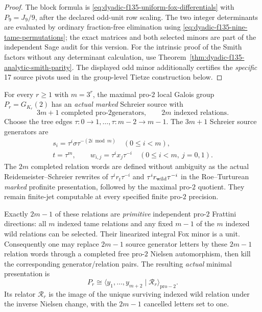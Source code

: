 \begin{proof}
The block formula
is
\eqref{eq:dyadic-f135-uniform-fox-differentials}
with $P_9=J_9/9$,
after the declared
odd-unit row
scaling.
The two
integer determinants
are evaluated by
ordinary fraction-free
elimination using
\eqref{eq:dyadic-f135-nine-tame-permutations};
the exact matrices
and both selected
minors are part
of the
independent Sage
audit for this
version.
For the
intrinsic proof
of the Smith
factors without
any determinant
calculation, use
Theorem~\ref{thm:dyadic-f135-analytic-smith-parity}.
The displayed
odd minor additionally
certifies the
\emph{specific}
17 source pivots
used in the
group-level
Tietze construction
below.
\end{proof}

\begin{theorem}
\label{thm:dyadic-f135-actual-3power-pro2-schreier}
For every $r\ge1$
with $m=3^r$,
the maximal pro-$2$
local Galois group
$P_r=G_{K_r}(2)$
has an
\emph{actual marked}
Schreier source with
\begin{equation}\label{eq:dyadic-f135-general-schreier-counts}
\boxed{\qquad
3m+1\text{ completed pro-$2$
generators},\qquad
2m\text{ indexed relations}.
\qquad}
\end{equation}
Choose the
tree edges
$\tau:0\to1,\ldots,
\tau:m-2\to m-1$.
The
$3m+1$
Schreier
source generators
are
\begin{equation}\label{eq:dyadic-f135-general-schreier-words}
\boxed{
\begin{gathered}
s_i=
\tau^i\sigma
\tau^{-(2i\bmod m)}
\quad(0\le i<m),\\
t=\tau^m,\qquad
w_{i,j}=
\tau^i x_j\tau^{-i}
\quad(0\le i<m,\ j=0,1).
\end{gathered}}
\end{equation}
The $2m$
completed relation
words are defined
without ambiguity
as the actual
Reidemeister--Schreier
rewrites of
$\tau^ir_t\tau^{-i}$
and
$\tau^ir_{\rm wild}\tau^{-i}$
in the
Roe--Turturean
\emph{marked}
profinite presentation,
followed by the
maximal pro-$2$
quotient.
They remain
finite-jet
computable at
every specified
finite pro-$2$
precision.

Exactly $2m-1$
of these
relations are
\emph{primitive}
independent
pro-$2$ Frattini
directions:
all $m$ indexed
tame relations
and any fixed
$m-1$ of the
$m$ indexed
wild relations
can be selected.
Their
linearized
integral Fox
minor is a
unit.
Consequently
one may replace
$2m-1$
source generator
letters by these
$2m-1$
relation words
through a
completed
free pro-$2$
Nielsen
automorphism,
then kill the
corresponding
generator/relation
pairs.
The resulting
\emph{actual}
minimal
presentation is
\begin{equation}\label{eq:dyadic-f135-mplus2-one-relator}
\boxed{
P_r\cong
\langle
y_1,\ldots,y_{m+2}
\mid \mathscr R_r
\rangle_{\mathrm{pro}-2}.
}
\end{equation}
Its relator
$\mathscr R_r$
is the image of
the unique
surviving indexed
wild relation
under the inverse
Nielsen change,
with the
$2m-1$ cancelled
letters set
to one.


\end{theorem}
